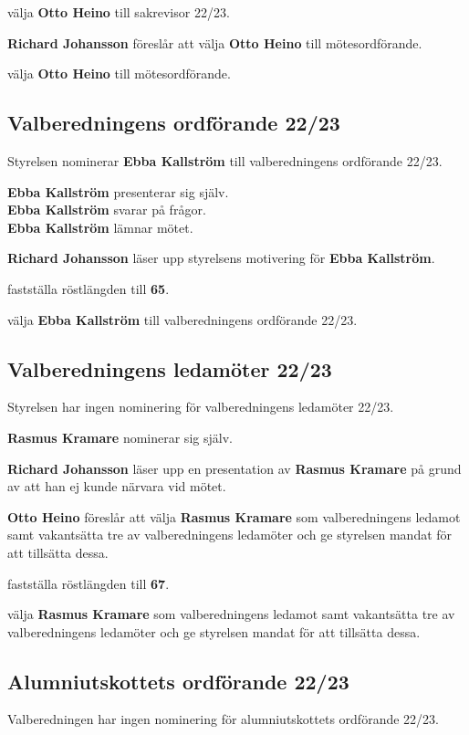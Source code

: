\documentclass[../protokoll_varmote_2022.tex]{subfiles}
\begin{document}
\motetbeslutar
\att{} välja \textbf{Otto Heino} till sakrevisor 22/23.


\textbf{Richard Johansson} föreslår att välja \textbf{Otto Heino} till mötesordförande.

\motetbeslutar\att{} välja \textbf{Otto Heino} till mötesordförande.


\subsection{Valberedningens ordförande 22/23}
Styrelsen nominerar \textbf{Ebba Kallström} till valberedningens ordförande 22/23.

\textbf{Ebba Kallström} presenterar sig själv.\\
\textbf{Ebba Kallström} svarar på frågor.\\
\textbf{Ebba Kallström} lämnar mötet.

\textbf{Richard Johansson} läser upp styrelsens motivering för \textbf{Ebba Kallström}.

\motetbeslutar\att{} fastställa röstlängden till \textbf{65}.

\motetbeslutar
\att{} välja \textbf{Ebba Kallström} till valberedningens ordförande 22/23.








\subsection{Valberedningens ledamöter 22/23}
Styrelsen har ingen nominering för valberedningens ledamöter 22/23.

\textbf{Rasmus Kramare} nominerar sig själv.

\textbf{Richard Johansson} läser upp en presentation av \textbf{Rasmus Kramare} på grund av att han ej kunde närvara vid mötet.

\textbf{Otto Heino} föreslår att välja \textbf{Rasmus Kramare} som valberedningens ledamot samt vakantsätta tre av valberedningens ledamöter och ge styrelsen mandat för att tillsätta dessa.

\motetbeslutar\att{} fastställa röstlängden till \textbf{67}.

\motetbeslutar
\att{} välja \textbf{Rasmus Kramare} som valberedningens ledamot samt vakantsätta tre av valberedningens ledamöter och ge styrelsen mandat för att tillsätta dessa.

\subsection{Alumniutskottets ordförande 22/23}
Valberedningen har ingen nominering för alumniutskottets ordförande 22/23.
\end{document}
